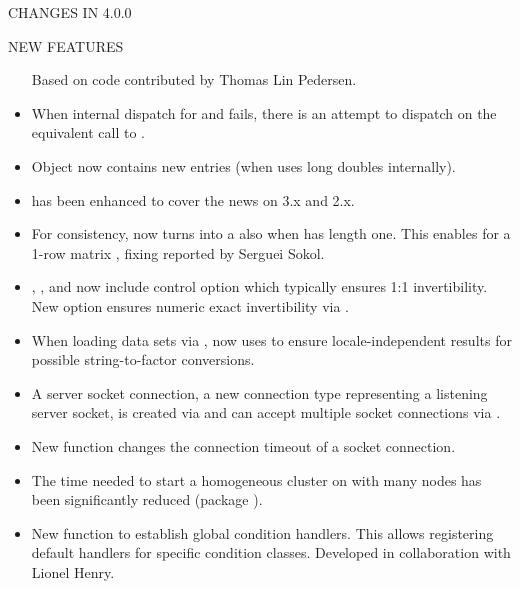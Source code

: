 \documentclass[letterpaper]{book}
\begin{document}
\begin{Section}{ CHANGES IN 4.0.0}
\begin{SubSection}{NEW FEATURES}
\begin{itemize}
\begin{itemize}
\end{itemize}

Based on code contributed by Thomas Lin Pedersen.

\item{} When internal dispatch for 
and  fails, there is an attempt to dispatch on the
equivalent call to .

\item{} Object  now contains new 
entries (when \R{} uses long doubles internally).

\item{}  has been enhanced to cover the news on \R{} 3.x
and 2.x.

\item{} For consistency,  now turns
 into a  also when  has length one.
This enables  for a 1-row matrix
, fixing  reported by Serguei Sokol.

\item{} , , and  now include control option 
which typically ensures 1:1 invertibility.  New option
 ensures numeric exact invertibility
via .

\item{} When loading data sets via ,
 now uses  to ensure
locale-independent results for possible string-to-factor
conversions.

\item{} A server socket connection, a new connection type
representing a listening server socket, is created via
 and can accept multiple socket connections
via .

\item{} New function  changes the connection
timeout of a socket connection.

\item{} The time needed to start a homogeneous  cluster on
 with many nodes has been significantly reduced
(package ).

\item{} New  function to establish
global condition handlers.  This allows registering default
handlers for specific condition classes. Developed in
collaboration with Lionel Henry.


\end{itemize}
\end{SubSection}
\end{Section}
\end{document}
